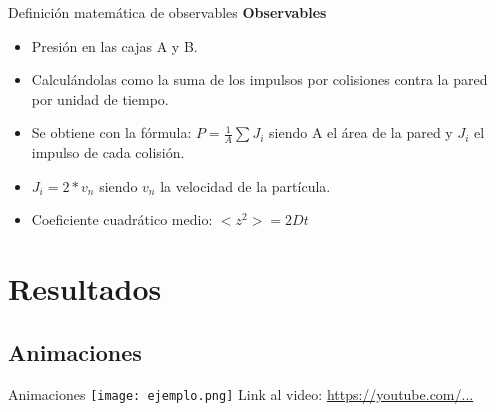 \documentclass{beamer}
\begin{document}
\begin{frame}{Definición matemática de observables}
  \textbf{Observables}
  \begin{itemize}
    \item Presión en las cajas A y B.
    \item Calculándolas como la suma de los impulsos por colisiones contra la pared por unidad de tiempo.
    \item Se obtiene con la fórmula: $P = \frac{1}{A} \sum J_i$ siendo A el área de la pared y $J_i$ el impulso de cada colisión.
    \item $J_i = 2 * v_n$ siendo $v_n$ la velocidad de la partícula.
    \item Coeficiente cuadrático medio: $<z^2> = 2Dt$
  \end{itemize}
\end{frame}

\section{Resultados}
\subsection{Animaciones}
\begin{frame}{Animaciones}
  \texttt{[image: ejemplo.png]}
  \vspace{0.3cm}
  \footnotesize Link al video: \url{https://youtube.com/...}
\end{frame}
\end{document}
